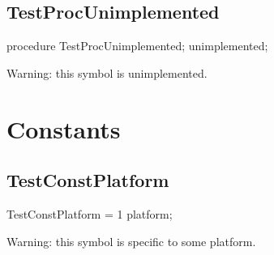 \documentclass{report}
\begin{document}
\subsection*{TestProcUnimplemented}
\begin{list}{}{
\setlength{\itemindent}{0cm}
\setlength{\listparindent}{0cm}
\setlength{\leftmargin}{\evensidemargin}
\addtolength{\leftmargin}{\tmplength}
\settowidth{\labelsep}{X}
\addtolength{\leftmargin}{\labelsep}
\setlength{\labelwidth}{\tmplength}
}
\begin{flushleft}
\item[\textbf{Declaration}\hfill]
\begin{ttfamily}
procedure TestProcUnimplemented; unimplemented;\end{ttfamily}


\end{flushleft}
\par
\item[\textbf{Description}]
Warning: this symbol is unimplemented.

 

\end{list}
\section{Constants}
\subsection*{TestConstPlatform}
\begin{list}{}{
\setlength{\itemindent}{0cm}
\setlength{\listparindent}{0cm}
\setlength{\leftmargin}{\evensidemargin}
\addtolength{\leftmargin}{\tmplength}
\settowidth{\labelsep}{X}
\addtolength{\leftmargin}{\labelsep}
\setlength{\labelwidth}{\tmplength}
}
\begin{flushleft}
\item[\textbf{Declaration}\hfill]
\begin{ttfamily}
TestConstPlatform = 1 platform;\end{ttfamily}


\end{flushleft}
\par
\item[\textbf{Description}]
Warning: this symbol is specific to some platform.

 

\end{list}
\end{document}
